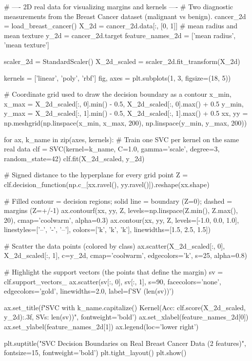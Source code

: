 \begin{codebox}[title={2D real data for visualizing margins and kernels}]
# ---- 2D real data for visualizing margins and kernels ----
# Two diagnostic measurements from the Breast Cancer dataset (malignant vs benign).
cancer_2d = load_breast_cancer()
X_2d = cancer_2d.data[:, [0, 1]]    # mean radius and mean texture
y_2d = cancer_2d.target
feature_names_2d = ['mean radius', 'mean texture']

scaler_2d = StandardScaler()
X_2d_scaled = scaler_2d.fit_transform(X_2d)

kernels = ['linear', 'poly', 'rbf']
fig, axes = plt.subplots(1, 3, figsize=(18, 5))

# Coordinate grid used to draw the decision boundary as a contour
x_min, x_max = X_2d_scaled[:, 0].min() - 0.5, X_2d_scaled[:, 0].max() + 0.5
y_min, y_max = X_2d_scaled[:, 1].min() - 0.5, X_2d_scaled[:, 1].max() + 0.5
xx, yy = np.meshgrid(np.linspace(x_min, x_max, 200), np.linspace(y_min, y_max, 200))

for ax, k_name in zip(axes, kernels):
    # Train one SVC per kernel on the same real data
    clf = SVC(kernel=k_name, C=1.0, gamma='scale', degree=3, random_state=42)
    clf.fit(X_2d_scaled, y_2d)

    # Signed distance to the hyperplane for every grid point
    Z = clf.decision_function(np.c_[xx.ravel(), yy.ravel()]).reshape(xx.shape)

    # Filled contour = decision regions; solid line = boundary (Z=0); dashed = margins (Z=+/-1)
    ax.contourf(xx, yy, Z, levels=np.linspace(Z.min(), Z.max(), 20), cmap='coolwarm', alpha=0.3)
    ax.contour(xx, yy, Z, levels=[-1.0, 0.0, 1.0], linestyles=['--', '-', '--'], colors=['k', 'k', 'k'], linewidths=[1.5, 2.5, 1.5])

    # Scatter the data points (colored by class)
    ax.scatter(X_2d_scaled[:, 0], X_2d_scaled[:, 1], c=y_2d, cmap='coolwarm', edgecolors='k', s=25, alpha=0.8)

    # Highlight the support vectors (the points that define the margin)
    sv = clf.support_vectors_
    ax.scatter(sv[:, 0], sv[:, 1], s=90, facecolors='none', edgecolors='gold', linewidths=2.0, label=f'SV ({len(sv)})')

    ax.set_title(f"SVC with {k_name.capitalize()} Kernel\n(Acc: {clf.score(X_2d_scaled, y_2d):.3f}, SVs: {len(sv)})", fontweight='bold')
    ax.set_xlabel(feature_names_2d[0])
    ax.set_ylabel(feature_names_2d[1])
    ax.legend(loc='lower right')

plt.suptitle("SVC Decision Boundaries on Real Breast Cancer Data (2 features)", fontsize=15, fontweight='bold')
plt.tight_layout()
plt.show()
\end{codebox}

